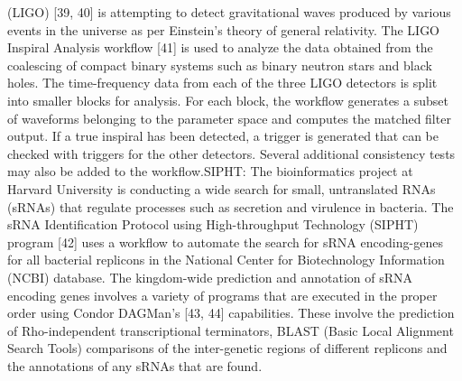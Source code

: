 (LIGO) [39, 40] is attempting to detect gravitational waves produced by various events in the universe as per Einstein’s theory of general relativity. The LIGO Inspiral Analysis workflow [41] is used to analyze the data obtained from the coalescing of compact binary systems such as binary neutron stars and black holes. The time-frequency data from each of the three LIGO detectors is split into smaller blocks for analysis. For each block, the workflow generates a subset of waveforms belonging to the parameter space and computes the matched filter output. If a true inspiral has been detected, a trigger is generated that can be checked with triggers for the other detectors. Several additional consistency tests may also be added to the workflow.SIPHT: The bioinformatics project at Harvard University is conducting a wide search for small, untranslated RNAs (sRNAs) that regulate processes such as secretion and virulence in bacteria. The sRNA Identification Protocol using High-throughput Technology (SIPHT) program [42] uses a workflow to automate the search for sRNA encoding-genes for all bacterial replicons in the National Center for Biotechnology Information (NCBI) database. The kingdom-wide prediction and annotation of sRNA encoding genes involves a variety of programs that are executed in the proper order using Condor DAGMan’s [43, 44] capabilities. These involve the prediction of Rho-independent transcriptional terminators, BLAST (Basic Local Alignment Search Tools) comparisons of the inter-genetic regions of different replicons and the annotations of any sRNAs that are found.


